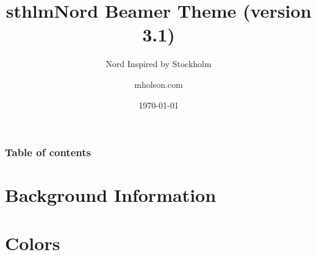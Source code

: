 \documentclass[aspectratio=169, sectionpages,codehl]{beamer}
\title{sthlmNord Beamer Theme (version 3.1)}
\subtitle{Nord Inspired by Stockholm}
\author{mholson.com}
\institute{School in Stockholm}
\date{\today}
\begin{document}
\titlepage


\begin{frame}
	\frametitle{Table of contents}
	\tableofcontents
\end{frame}

\section{Background Information}









\section{Colors}





\end{document}
